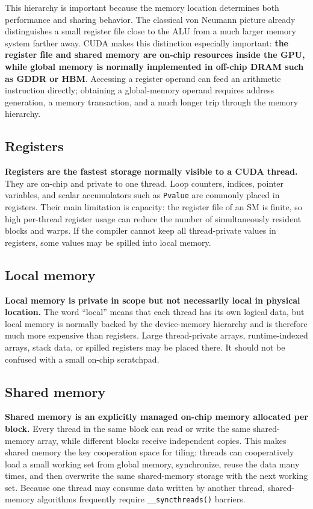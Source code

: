 \documentclass[11pt,a4paper]{article}
\begin{document}
This hierarchy is important because the memory location determines both performance and sharing behavior. The classical von Neumann picture already distinguishes a small register file close to the ALU from a much larger memory system farther away. CUDA makes this distinction especially important: \textbf{the register file and shared memory are on-chip resources inside the GPU, while global memory is normally implemented in off-chip DRAM such as GDDR or HBM}. Accessing a register operand can feed an arithmetic instruction directly; obtaining a global-memory operand requires address generation, a memory transaction, and a much longer trip through the memory hierarchy.

\subsection{Registers}

\textbf{Registers are the fastest storage normally visible to a CUDA thread.} They are on-chip and private to one thread. Loop counters, indices, pointer variables, and scalar accumulators such as \texttt{Pvalue} are commonly placed in registers. Their main limitation is capacity: the register file of an SM is finite, so high per-thread register usage can reduce the number of simultaneously resident blocks and warps. If the compiler cannot keep all thread-private values in registers, some values may be spilled into local memory.

\subsection{Local memory}

\textbf{Local memory is private in scope but not necessarily local in physical location.} The word ``local'' means that each thread has its own logical data, but local memory is normally backed by the device-memory hierarchy and is therefore much more expensive than registers. Large thread-private arrays, runtime-indexed arrays, stack data, or spilled registers may be placed there. It should not be confused with a small on-chip scratchpad.

\subsection{Shared memory}

\textbf{Shared memory is an explicitly managed on-chip memory allocated per block.} Every thread in the same block can read or write the same shared-memory array, while different blocks receive independent copies. This makes shared memory the key cooperation space for tiling: threads can cooperatively load a small working set from global memory, synchronize, reuse the data many times, and then overwrite the same shared-memory storage with the next working set. Because one thread may consume data written by another thread, shared-memory algorithms frequently require \texttt{\_\_syncthreads()} barriers.
\end{document}
